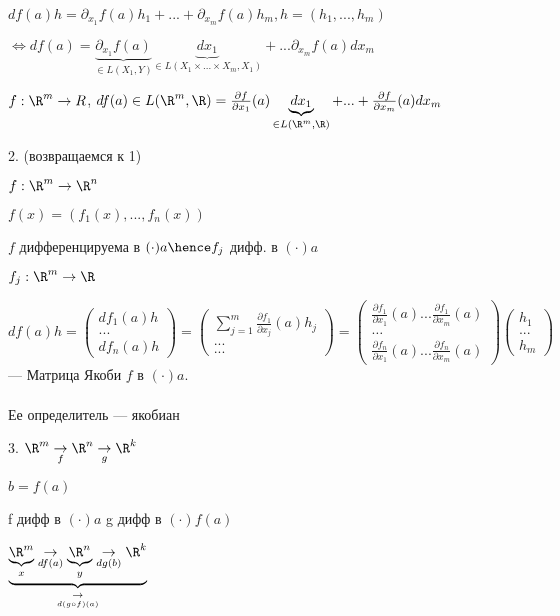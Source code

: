 \begin{remark}
    $df(a)h = \partial_{x_1}f(a)h_1 + ... + \partial_{x_m}f(a)h_m, h = (h_1, ..., h_m)$ 
    
    $\Longleftrightarrow df(a) = \underbrace{\partial_{x_1}f(a)}_{\in L(X_1, Y)} \underbrace{dx_1}_{\in L(X_1 \times ... \times X_m, X_1)} + ... \partial_{x_m}f(a)dx_m$
    
    $f : \R^ m \to R$, $df(a) \in L(\R ^ m, \R) = \frac{\partial f}{\partial x_1}(a) \underbrace{dx_1}_{\in L(\R^m, \R)} + ... + \frac{\partial f}{\partial x_m}(a) dx_m$
\end{remark}

2. (возвращаемся к 1)

$f : \R ^ m \to \R^n$

$f(x) = (f_1(x), ..., f_n(x))$

$f$ дифференцируема в $(\cdot) a \hence f_j$ дифф. в $(\cdot) a$


$f_j : \R^ m \to \R$

$df(a)h = \begin{pmatrix}
    df_1(a)h\\
    ...\\
    df_n(a)h
\end{pmatrix} = \begin{pmatrix}
    \sum_{j=1}^m \frac{\partial f_1}{\partial x_j}(a) h_j\\
    ...\\
    ... 
\end{pmatrix} = \begin{pmatrix}
    \frac{\partial f_1}{\partial x_1}(a) ... \frac{\partial f_1}{\partial x_m}(a) \\
    \dots \\
    \frac{\partial f_n}{\partial x_1}(a) ... \frac{\partial f_n}{\partial x_m}(a) 
\end{pmatrix} \begin{pmatrix}
    h_1\\
    ...\\
    h_m
\end{pmatrix}$ --- Матрица Якоби $f$ в $(\cdot) a$. \\ \\ Ее определитель --- якобиан


3. $\R^m \underset{f}{\to} \R^n \underset{g}{\to}  \R ^ k$

$b = f(a)$

f дифф в $(\cdot) a$
g дифф в $(\cdot) f(a)$

$\underbrace{\underbrace{\R ^ m}_{x} \underset{df(a)}{\to} \underbrace{\R ^ n}_{y} \underset{dg(b)}{\to} \R ^ k}_{\underset{d(g\circ f)(a)}{\to}}$

